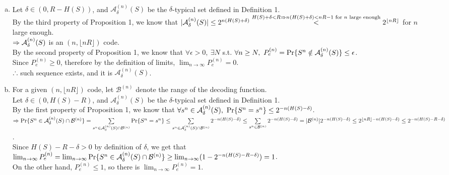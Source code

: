 \begin{pr}$ $

\renewcommand{\A}{{\mathcal{A}_\delta^{(n)}(S)}}
\renewcommand{\B}{{\mathcal{B}^{(n)}}}

\begin{enumerate}[(a)]

\item Let $\delta\in(0, R-H(S))$, and $\A$ be the $\delta$-typical set defined in Definition 1.\\
By the third property of Proposition 1, we know that $|\A|\leq2^{n(H(S)+\delta)}\\
\overset{H(S)+\delta<R\then n(H(S)+\delta)<nR-1\text{ for }n\text{ large enough}}<2^{\lfloor nR\rfloor}$ for $n$ large enough.\\
$\then\A$ is an $(n, \lfloor nR\rfloor)$ code.\\
By the second property of Proposition 1, we know that $\forall\epsilon>0,\ \exists N$ s.t. $\forall n\geq N,\ P_e^{(n)}=\P\{S^n\notin\A\}\leq\epsilon$.\\
Since $P_e^{(n)}\geq0$, therefore by the definition of limits, $\lim_{n\to\infty}P_e^{(n)}=0$.\\
$\therefore$ such sequence exists, and it is $\A$.

\item For a given $(n, \lfloor nR\rfloor)$ code, let $\B$ denote the range of the	decoding function.\\
Let $\delta\in(0, H(S)-R)$, and $\A$ be the $\delta$-typical set defined in Definition 1.\\
By the first property of Proposition 1, we know that $\forall s^n\in\A,\ \P\{S^n=s^n\}\leq2^{-n(H(S)-\delta)}$.\\
$\then\P\{S^n\in\A\cap\B\}=\suml_{s^n\in\A\cap\B}\P\{S^n=s^n\}\\
\leq\suml_{s^n\in\A\cap\B}2^{-n(H(S)-\delta)}\leq\suml_{s^n\in\B}2^{-n(H(S)-\delta)}\\
=|\B|2^{-n(H(S)-\delta)}\leq2^{\lfloor nR\rfloor-n(H(S)-\delta)}\leq2^{-n(H(S)-R-\delta)}$.\\
Since $H(S)-R-\delta>0$ by definition of $\delta$, we get that \\$\lim_{n\to\infty}P_e^{(n)}=\lim_{n\to\infty}\P\{S^n\in\A\cap\B\}\geq\lim_{n\to\infty}(1-2^{-n(H(S)-R-\delta)})=1$.\\
On the other hand, $P_e^{(n)}\leq1$, so there is $\lim_{n\to\infty}P_e^{(n)}=1$.

\end{enumerate}
\end{pr}
